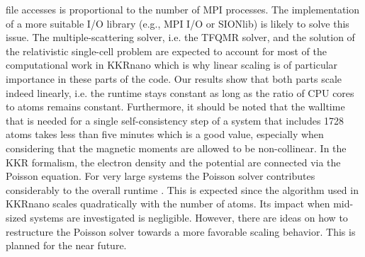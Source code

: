 \documentclass[graybox]{svmult}
\begin{document}
file accesses is proportional to the number of MPI processes.
The implementation of a more suitable I/O library (e.g., MPI I/O or SIONlib) is likely to solve this issue.
The multiple-scattering solver, i.e. the TFQMR solver, 
and the solution of the relativistic single-cell problem are
expected to account for most of the computational work in KKRnano which 
is why linear scaling is of particular importance in these parts of the code.
Our results show that both parts scale indeed linearly, i.e. the runtime stays constant as long as
the ratio of CPU cores to atoms remains constant.
Furthermore, it should be noted that the walltime that is needed for a single self-consistency step of a system
that includes 1728 atoms
takes less than five minutes which is a good value, especially when considering that
the magnetic moments are allowed to be non-collinear.
In the KKR formalism, the electron density and the potential are connected via the Poisson equation. 
For very large systems the Poisson solver contributes considerably
to the overall runtime \cite{brommel_juqueen_2017}.
This is expected since the algorithm used in KKRnano scales
quadratically with the number of atoms. Its impact when mid-sized systems are investigated is negligible. 
However, there are ideas on how to restructure the Poisson solver towards a more favorable scaling behavior.
This is planned for the near future.
\end{document}
